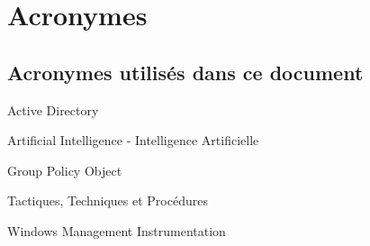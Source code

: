 \chapter*{Acronymes}

\section*{Acronymes utilisés dans ce document}

\begin{description}[leftmargin=2.4cm,style=nextline]
    \item [AD] Active Directory
    \item [AI (ou IA)] Artificial Intelligence - Intelligence Artificielle
    \item [GPO] Group Policy Object
    \item [TTP] Tactiques, Techniques et Procédures
    \item [WMI] Windows Management Instrumentation
\end{description}
